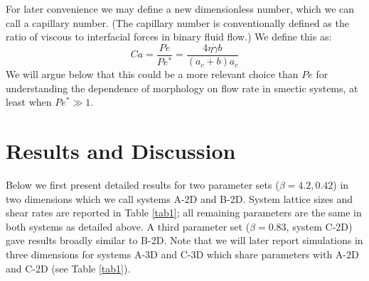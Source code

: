 \documentclass[8.5pt,twoside,twocolumn]{article}
\begin{document}
For later convenience we may define a new dimensionless number,
which we can call a capillary number. (The capillary number is conventionally defined as the ratio of viscous to interfacial forces in binary fluid flow.) We define this as:
%
\begin{equation}
Ca = \frac{Pe}{Pe^*} = \frac{4\eta\dot\gamma b}{(a_c+b)a_c}
\label{capillary}
\end{equation}
%
We will argue below that this could be a more relevant choice than $Pe$ for understanding the dependence of morphology on flow rate in smectic systems, at least when $Pe^*\gg 1$.

\section{Results and Discussion}

Below we first present detailed results for two parameter sets ($\beta = 4.2, 0.42$) in two dimensions which we call systems A-2D and B-2D. System lattice sizes and shear rates are reported in Table \ref{tab1}; all remaining parameters are the same in both systems as detailed above. 
A third parameter set ($\beta = 0.83$, system C-2D) gave results broadly similar to B-2D. Note that we will later report simulations in three dimensions for systems A-3D and C-3D which share parameters with A-2D and C-2D (see Table \ref{tab1}).
\end{document}
